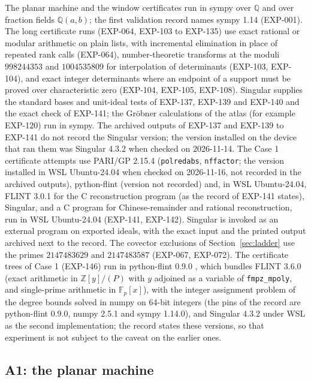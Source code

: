 \documentclass[11pt]{article}
\theoremstyle{remark}
\newcommand{\Q}{\mathbb{Q}}
\begin{document}
The planar machine and the window certificates run in sympy over $\Q$ and over fraction fields
$\Q(a,b)$; the first validation record names sympy 1.14 (EXP-001). The long certificate runs
(EXP-064, EXP-103 to EXP-135) use exact rational or modular arithmetic on plain lists, with
incremental elimination in place of repeated rank calls (EXP-064), number-theoretic transforms at
the moduli $998244353$ and $1004535809$ for interpolation of determinants (EXP-103, EXP-104),
and exact integer determinants where an endpoint of a support must be proved over characteristic
zero (EXP-104, EXP-105, EXP-108). Singular \cite{Singular432} supplies the standard bases and unit-ideal tests of
EXP-137, EXP-139 and EXP-140 and the exact check of EXP-141; the Gr\"obner calculations of the atlas (for example
EXP-120) run in sympy. The archived outputs of EXP-137 and EXP-139 to EXP-141 do not record the Singular version; the version installed on the device that ran them was
Singular 4.3.2 when checked on 2026-11-14. The Case 1 certificate attempts use PARI/GP 2.15.4 \cite{PARI2}
(\texttt{polredabs}, \texttt{nffactor}; the version installed in WSL Ubuntu-24.04 when checked on 2026-11-16, not recorded in the archived outputs), python-flint (version not recorded) and, in WSL Ubuntu-24.04, FLINT 3.0.1 for the C reconstruction program (as the record of EXP-141 states), Singular, and a C
program for Chinese-remainder and rational reconstruction, run in WSL Ubuntu-24.04 (EXP-141,
EXP-142). Singular is invoked as an external program on exported ideals, with the exact input and the printed output archived next to the record. The covector exclusions of Section~\ref{sec:ladder} use the primes $2147483629$ and
$2147483587$ (EXP-067, EXP-072). The certificate trees of Case 1 (EXP-146) run in python-flint 0.9.0 \cite{pythonflint}, which bundles FLINT 3.6.0 \cite{FLINT} (exact arithmetic in $\mathbb Z[y]/(P)$ with $y$ adjoined as a variable of
\texttt{fmpz\_mpoly}, and single-prime arithmetic in $\mathbb F_p[x]$), with the integer assignment problem of the degree bounds solved in numpy on
64-bit integers (the pins of the record are python-flint 0.9.0, numpy 2.5.1 and sympy 1.14.0), and Singular 4.3.2 under WSL as the second implementation; the
record states these versions, so that experiment is not subject to the caveat on the earlier ones.

\subsection{A1: the planar machine}
\end{document}
